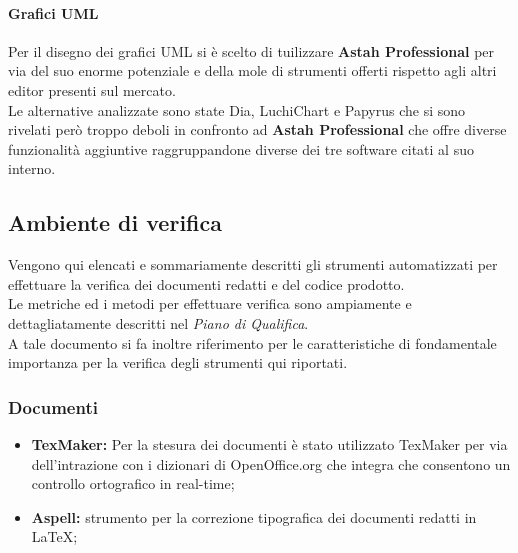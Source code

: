     \paragraph{Grafici UML}
      Per il disegno dei grafici UML si è scelto di tuilizzare \textbf{Astah Professional} per via del suo enorme potenziale e della mole di strumenti offerti
      rispetto agli altri editor presenti sul mercato.\\
      Le alternative analizzate sono state Dia, LuchiChart e Papyrus che si sono rivelati però troppo deboli in confronto ad \textbf{Astah Professional} che offre
      diverse funzionalità aggiuntive raggruppandone diverse dei tre software citati al suo interno.
  \subsection{Ambiente di verifica}
    Vengono qui elencati e sommariamente descritti gli strumenti automatizzati per effettuare la verifica dei documenti redatti e del codice prodotto.\\
    Le metriche ed i metodi per effettuare verifica sono ampiamente e dettagliatamente descritti nel \emph{Piano di Qualifica}.\\
    A tale documento si fa inoltre riferimento per le caratteristiche di fondamentale importanza per la verifica degli strumenti qui riportati.
    \subsubsection{Documenti}
      \begin{itemize}
        \item \textbf{TexMaker: }Per la stesura dei documenti è stato utilizzato TexMaker per via dell'intrazione con i dizionari di OpenOffice.org che integra
        che consentono un controllo ortografico in real-time;
        \item \textbf{Aspell: }strumento per la correzione tipografica dei documenti redatti in \LaTeX;
      \end{itemize}
